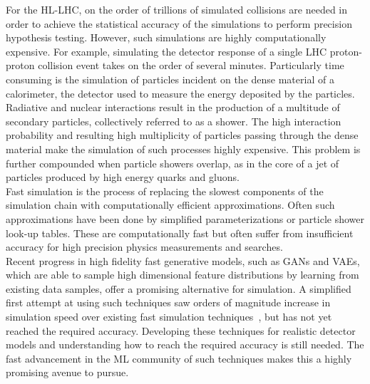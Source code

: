 For the HL-LHC, on the order of trillions of simulated collisions are needed in order to achieve the statistical accuracy of the simulations to perform precision hypothesis testing. However, such simulations are highly computationally expensive. For example, simulating the detector response of  a single LHC proton-proton collision event takes on the order of several minutes. Particularly time consuming is the simulation of particles incident on the dense material of a calorimeter, the detector used to measure the energy deposited by the particles. Radiative and nuclear interactions result in the production of a multitude of secondary particles, collectively referred to as a shower.
The high interaction probability and resulting high multiplicity of particles passing through the dense material make the simulation of such processes highly expensive. This problem is further compounded when particle showers overlap, as in the core of a jet of particles produced by high energy quarks and gluons.\\


Fast simulation is the process of replacing the slowest components of the simulation chain with computationally efficient approximations. Often such approximations have been done by simplified parameterizations or particle shower look-up tables. These are computationally fast but often suffer from insufficient accuracy for high precision physics measurements and searches.\\

Recent progress in high fidelity fast generative models, such as GANs and VAEs, which are able to sample high dimensional feature distributions by learning from existing data samples, offer a promising alternative for simulation.
%
A simplified first attempt at using such techniques saw orders of magnitude increase in simulation speed over existing fast simulation techniques~\cite{Paganini:2017hrr}, but has not yet reached the required accuracy. Developing these techniques for realistic detector models and understanding how to reach the required accuracy is still needed. The fast advancement in the ML community of such techniques makes this a highly promising avenue to pursue.\\

